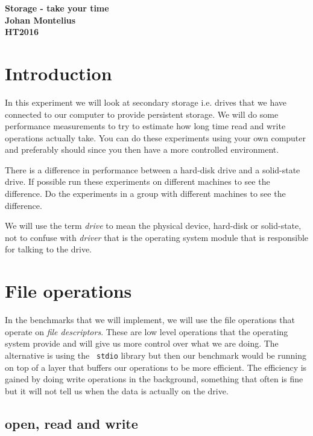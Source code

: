\documentclass[a4paper,11pt]{article}
\begin{document}
\begin{center} \vspace{20pt} \textbf{\large Storage - take your time}\\
\vspace{10pt} \textbf{Johan Montelius}\\ \vspace{10pt} \textbf{HT2016}
\end{center}


\section{Introduction}

In this experiment we will look at secondary storage i.e. drives that we
have connected to our computer to provide persistent storage. We will
do some performance measurements to try to estimate how long time read
and write operations actually take. You can do these experiments using
your own computer and preferably should since you then have a more
controlled environment. 

There is a difference in performance between a hard-disk drive and a
solid-state drive. If possible run these experiments on different
machines to see the difference. Do the experiments in a group with
different machines to see the difference. 

We will use the term {\em drive} to mean the physical device,
hard-disk or solid-state, not to confuse with {\em driver} that is the
operating system module that is responsible for talking to the drive.


\section{File operations}



In the benchmarks that we will implement, we will use the file
operations that operate on {\em file descriptors}. These are low level
operations that the operating system provide and will give us more
control over what we are doing. The alternative is using the {\tt
  stdio} library but then our benchmark would be running on top of a
layer that buffers our operations to be more efficient. The efficiency
is gained by doing write operations in the background,
something that often is fine but it will not tell us when the data is
actually on the drive.

\subsection*{open, read and write}
\end{document}
